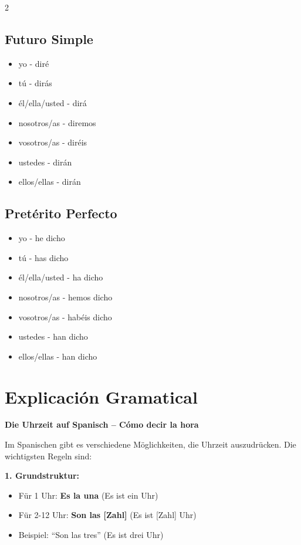 \documentclass[12pt,a4paper]{article}
\begin{document}
\begin{multicols}{2}
\columnbreak

\subsection*{Futuro Simple}
\begin{itemize}[leftmargin=*]
    \item yo - diré
    \item tú - dirás
    \item él/ella/usted - dirá
    \item nosotros/as - diremos
    \item vosotros/as - diréis
    \item ustedes - dirán
    \item ellos/ellas - dirán
\end{itemize}

\subsection*{Pretérito Perfecto}
\begin{itemize}[leftmargin=*]
    \item yo - he dicho
    \item tú - has dicho
    \item él/ella/usted - ha dicho
    \item nosotros/as - hemos dicho
    \item vosotros/as - habéis dicho
    \item ustedes - han dicho
    \item ellos/ellas - han dicho
\end{itemize}

\end{multicols}

\newpage

\section*{Explicación Gramatical}

\textbf{Die Uhrzeit auf Spanisch -- Cómo decir la hora}

Im Spanischen gibt es verschiedene Möglichkeiten, die Uhrzeit auszudrücken. Die wichtigsten Regeln sind:

\textbf{1. Grundstruktur:}
\begin{itemize}[leftmargin=*]
    \item Für 1 Uhr: \textbf{Es la una} (Es ist ein Uhr)
    \item Für 2-12 Uhr: \textbf{Son las [Zahl]} (Es ist [Zahl] Uhr)
    \item Beispiel: \enquote{Son las tres} (Es ist drei Uhr)
\end{itemize}
\end{document}
